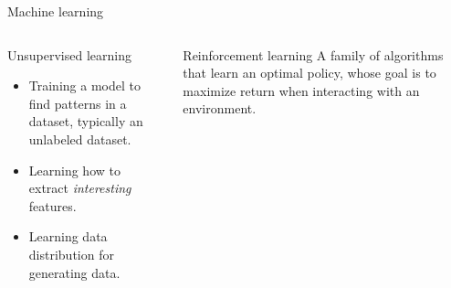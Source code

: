 \begin{frame}{Machine learning}
	\begin{columns}
		\begin{column}{.5\textwidth}
			\begin{block}{Unsupervised learning}
				\begin{itemize}
					\item Training a model to find patterns in a dataset, typically an unlabeled dataset.
					\item Learning how to extract {\em interesting} features.
					\item Learning data distribution for generating data.
				\end{itemize}
			\end{block}
		\end{column}
		\begin{column}{.5\textwidth}
			\begin{block}{Reinforcement learning}
				A family of algorithms that learn an optimal policy, whose goal is to maximize return when interacting with an environment. 
			\end{block}
		\end{column}
	\end{columns}
\end{frame}